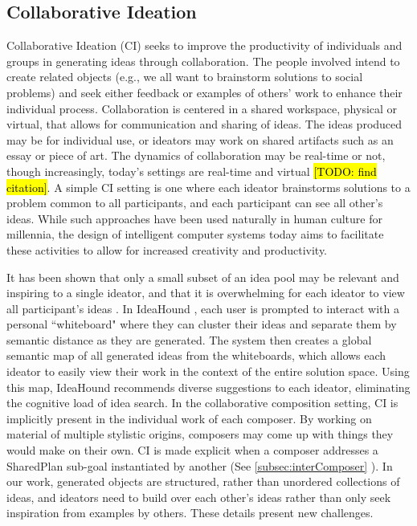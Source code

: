 \documentclass[final,authoryear,5p,times,twocolumn]{elsarticle}
\begin{document}
\subsection{Collaborative Ideation}
Collaborative Ideation (CI) seeks to improve the productivity of individuals and groups in generating ideas through collaboration. The people involved intend to create related objects (e.g., we all want to brainstorm solutions to social problems) and seek either feedback or examples of others' work to enhance their individual process. Collaboration is centered in a shared workspace, physical or virtual, that allows for communication and sharing of ideas. The ideas produced may be for individual use, or ideators may work on shared artifacts such as an essay or piece of art. The dynamics of collaboration may be real-time or not, though increasingly, today's settings are real-time and virtual \hl{[TODO: find citation]}. A simple CI setting is one where each ideator brainstorms solutions to a problem common to all participants, and each participant can see all other's ideas. While such approaches have been used naturally in human culture for millennia, the design of intelligent computer systems today aims to facilitate these activities to allow for increased creativity and productivity. 

It has been shown that only a small subset of an idea pool may be relevant and inspiring to a single ideator, and that it is overwhelming for each ideator to view all participant's ideas \citep{siangliulue2015toward}. In IdeaHound \citep{siangliulue2016ideahound}, each user is prompted to interact with a personal ``whiteboard" where they can cluster their ideas and separate them by semantic distance as they are generated. The system then creates a global semantic map of all generated ideas from the whiteboards, which allows each ideator to easily view their work in the context of the entire solution space. Using this map, IdeaHound recommends diverse suggestions to each ideator, eliminating the cognitive load of idea search. In the collaborative composition setting, CI is implicitly present in the individual work of each composer. By working on material of multiple stylistic origins, composers may come up with things they would make on their own. CI is made explicit when a composer addresses a SharedPlan sub-goal instantiated by another (See \ref{subsec:interComposer} ). In our work, generated objects are structured, rather than unordered collections of ideas, and ideators need to build over each other's ideas rather than only seek inspiration from examples by others. These details present new challenges.
\end{document}
